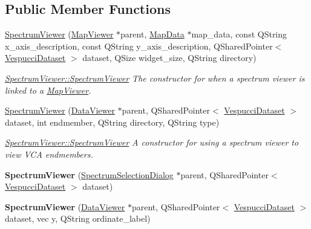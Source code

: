 \subsection*{Public Member Functions}
\begin{DoxyCompactItemize}
\item 
\hyperlink{class_spectrum_viewer_a55a3c332d6c0a2c98a1885fd35194064}{Spectrum\+Viewer} (\hyperlink{class_map_viewer}{Map\+Viewer} $\ast$parent, \hyperlink{class_map_data}{Map\+Data} $\ast$map\+\_\+data, const Q\+String x\+\_\+axis\+\_\+description, const Q\+String y\+\_\+axis\+\_\+description, Q\+Shared\+Pointer$<$ \hyperlink{class_vespucci_dataset}{Vespucci\+Dataset} $>$ dataset, Q\+Size widget\+\_\+size, Q\+String directory)
\begin{DoxyCompactList}\small\item\em \hyperlink{class_spectrum_viewer_a55a3c332d6c0a2c98a1885fd35194064}{Spectrum\+Viewer\+::\+Spectrum\+Viewer} The constructor for when a spectrum viewer is linked to a \hyperlink{class_map_viewer}{Map\+Viewer}. \end{DoxyCompactList}\item 
\hyperlink{class_spectrum_viewer_a73bcfd2a82ca275f3c387e40737d21a1}{Spectrum\+Viewer} (\hyperlink{class_data_viewer}{Data\+Viewer} $\ast$parent, Q\+Shared\+Pointer$<$ \hyperlink{class_vespucci_dataset}{Vespucci\+Dataset} $>$ dataset, int endmember, Q\+String directory, Q\+String type)
\begin{DoxyCompactList}\small\item\em \hyperlink{class_spectrum_viewer_a55a3c332d6c0a2c98a1885fd35194064}{Spectrum\+Viewer\+::\+Spectrum\+Viewer} A constructor for using a spectrum viewer to view V\+CA endmembers. \end{DoxyCompactList}\item 
{\bfseries Spectrum\+Viewer} (\hyperlink{class_spectrum_selection_dialog}{Spectrum\+Selection\+Dialog} $\ast$parent, Q\+Shared\+Pointer$<$ \hyperlink{class_vespucci_dataset}{Vespucci\+Dataset} $>$ dataset)\hypertarget{class_spectrum_viewer_a734548147baeb9247d339bfa8225a707}{}\label{class_spectrum_viewer_a734548147baeb9247d339bfa8225a707}

\item 
{\bfseries Spectrum\+Viewer} (\hyperlink{class_data_viewer}{Data\+Viewer} $\ast$parent, Q\+Shared\+Pointer$<$ \hyperlink{class_vespucci_dataset}{Vespucci\+Dataset} $>$ dataset, vec y, Q\+String ordinate\+\_\+label)\hypertarget{class_spectrum_viewer_af46a03a98bae45e00b0d5e63832fd7cb}{}\label{class_spectrum_viewer_af46a03a98bae45e00b0d5e63832fd7cb}


\end{DoxyCompactItemize}
